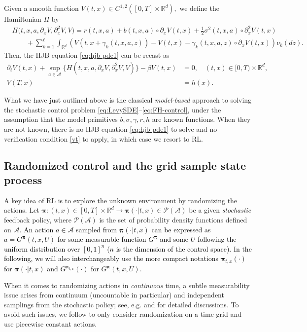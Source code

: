 \documentclass[11pt]{article}
\newcommand{\1}{\mathbbm{1}}
\newcommand{\bpi}{\boldsymbol{\pi}}
\newcommand{\gao}[1]{\textcolor{black}{{#1}}}
\begin{document}
Given a smooth function $V(t,x) \in C^{1,2}([0, T] \times \mathbb{R}^d),$
we define the Hamiltonian $H$ by
\begin{align}
	&H\big(t,x, a, \partial_x V, \partial_x^2 V, V\big)=r(t, x, a)  +  b(t, x, a) \circ \partial_x V(t,x) + \frac{1}{2} \sigma^2(t,x,a) \circ \partial^2_x V(t,x) \\
	&\phantom{\quad\quad}+\sum_{k=1}^\ell \int_{\mathbb{R}^d} \left( V(t, x+  \gamma_k(t, x ,a, z)) - V(t,x) - \gamma_k(t,x,a,z) \circ  \partial_xV(t,x) \right) \nu_k (dz).\label{eq:Hal-1}
\end{align}
Then, the HJB equation \eqref{eq:hjb-pde1} can be recast as
\begin{align} \label{eq:hjb-pde2}
	\partial_t V(t, x) + \sup_{a \in \mathcal{A}} \{ H(t, x, a, \partial_xV, \partial_x^2V, V)   \} - \beta V(t, x) &= 0, \quad (t,x) \in [0, T)\times \mathbb{R}^d,\\
	V(T, x) &= h(x).\nonumber
\end{align}

What we have just outlined above is the classical {\it model-based} approach to solving the stochastic control problem \eqref{eq:LevySDE}--\eqref{eq:FH-control}, under the assumption that the model primitives $b, \sigma, \gamma, r, h$ are known functions. When they are not known, there is no HJB equation \eqref{eq:hjb-pde1} to solve and no verification condition \eqref{vt} to apply, in which case we   resort to RL.

\subsection{Randomized control and the grid sample state process}\label{sec:expl-formulation}
A key idea of RL is to explore the unknown environment by randomizing the actions. Let $\bpi: (t,x) \in [0,T] \times \mathbb{R}^d \rightarrow  \bpi (\cdot| t,x) \in \mathcal{P} (\mathcal{A})$ be a given {\it stochastic} feedback policy, where $\mathcal{P} (\mathcal{A})$ is the set of probability density functions defined on $\mathcal{A}$.  \gao{ An action $a\in \mathcal{A}$ sampled from $\bpi (\cdot| t,x)$ can be expressed as $a = G^{\bpi}(t,x,U)$ for some measurable function $G^{\bpi}$ and some $U$ following the uniform distribution over $[0,1]^n$ ($n$ is the dimension of the control space). In the following, we will also interchangeably use the more compact notations $\bpi_{t,x}(\cdot)$ for $\bpi (\cdot| t,x)$ and  $G^{\bpi_{t,x}}(\cdot)$ for $G^{\bpi}(t,x,U)$. }

When it comes to randomizing actions in {\it continuous} time, a subtle measurability issue arises from continuum (uncountable in particular) and independent samplings from the stochastic policy; see, e.g. \cite{szpruch2024optimal} and \cite{bender2024continuous} for detailed discussions. To avoid such issues, we follow \cite{jia2025accuracy} to only consider randomization on a time grid and use piecewise constant actions.
\end{document}
